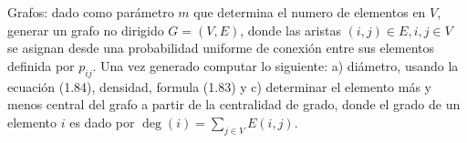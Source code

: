 \documentclass[letterpaper,11pt]{article}
\begin{document}
Grafos: dado como parámetro $m$ que determina el numero de elementos en $V$, generar un grafo no dirigido $G=(V,E)$, donde las aristas $(i,j)\in E, i,j\in V$ se asignan desde una probabilidad uniforme de conexión entre sus elementos definida por $p_{ij}$. Una vez generado computar lo siguiente: a) diámetro, usando la ecuación (1.84), densidad, formula (1.83) y c) determinar el elemento más y menos central del grafo a partir de la centralidad de grado, donde el grado de un elemento $i$ es dado por $\deg(i) = \sum_{j\in V} E(i,j)$.
\end{document}
